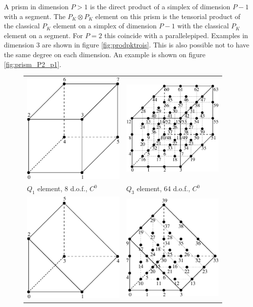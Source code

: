 \documentclass[11pt,a4paper]{article}
\begin{document}
A prism in dimension $P > 1$ is the direct product of a simplex of dimension $P-1$ with a segment. The $P_K \otimes P_K$ element on this prism is the tensorial product of the classical $P_K$ element on a simplex of dimension $P-1$ with the classical $P_K$ element on a segment. For $P=2$ this coincide with a parallelepiped. Examples in dimension $3$ are shown in figure \ref{fig:prodpktrois}. This is also possible not to have the same degree on each dimension. An example is shown on figure \ref{fig:prism_P2_p1}. 

\begin{figure}[H]
  \begin{center} \begin{tabular}{m{7cm}m{7cm}}
    \includegraphics[width=5cm,angle=0]{getfemlist_cube_Q1.eps} & \includegraphics[width=5cm,angle=0]{getfemlist_cube_Q3.eps} \\
    $Q_1$ element, 8 d.o.f., $C^0$ & $Q_3$ element, 64 d.o.f., $C^0$ \\
    \includegraphics[width=5cm,angle=0]{getfemlist_prism_P1.eps} & \includegraphics[width=5cm,angle=0]{getfemlist_prism_P3.eps} \\

\end{tabular}
\end{center}
\end{figure}
\end{document}
